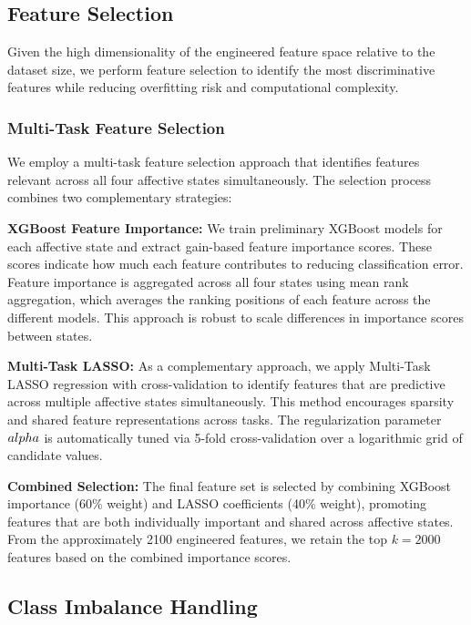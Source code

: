 \documentclass[11pt,a4paper]{article}
\begin{document}
\subsection{Feature Selection}

Given the high dimensionality of the engineered feature space relative to the dataset size, we perform feature selection to identify the most discriminative features while reducing overfitting risk and computational complexity.

\subsubsection{Multi-Task Feature Selection}

We employ a multi-task feature selection approach that identifies features relevant across all four affective states simultaneously. The selection process combines two complementary strategies:

\textbf{XGBoost Feature Importance:} We train preliminary XGBoost models for each affective state and extract gain-based feature importance scores. These scores indicate how much each feature contributes to reducing classification error. Feature importance is aggregated across all four states using mean rank aggregation, which averages the ranking positions of each feature across the different models. This approach is robust to scale differences in importance scores between states.

\textbf{Multi-Task LASSO:} As a complementary approach, we apply Multi-Task LASSO regression with cross-validation to identify features that are predictive across multiple affective states simultaneously. This method encourages sparsity and shared feature representations across tasks. The regularization parameter $\\alpha$ is automatically tuned via 5-fold cross-validation over a logarithmic grid of candidate values.

\textbf{Combined Selection:} The final feature set is selected by combining XGBoost importance (60\% weight) and LASSO coefficients (40\% weight), promoting features that are both individually important and shared across affective states. From the approximately 2100 engineered features, we retain the top $k = 2000$ features based on the combined importance scores.


\subsection{Class Imbalance Handling}
\end{document}

